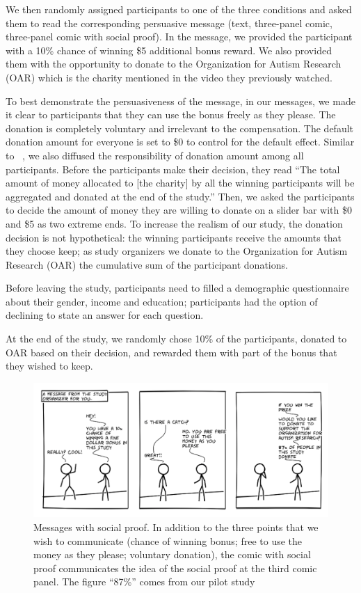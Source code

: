 We then randomly assigned participants to one of the three conditions and asked them to read the corresponding persuasive message (text, three-panel comic, three-panel comic with social proof). In the message, we provided the participant with a 10\% chance of winning \$5 additional bonus reward. We also provided them with the opportunity to donate to the Organization for Autism Research (OAR) which is the charity mentioned in the video they previously watched. 

To best demonstrate the persuasiveness of the message, in our messages, we made it clear to participants that they can use the bonus freely as they please. The donation is completely voluntary and irrelevant to the compensation. The default donation amount for everyone is set to \$0 to control for the default effect. Similar to ~\textcite{lee2013does}, we also diffused the responsibility of donation amount among all participants. Before the participants make their decision, they read ``The total amount of money allocated to [the charity] by all the winning participants will be aggregated and donated at the end of the study.'' Then, we asked the participants to decide the amount of money they are willing to donate on a slider bar with \$0 and \$5 as two extreme ends. To increase the realism of our study, the donation decision is not hypothetical: the winning participants receive the amounts that they choose keep; as study organizers we donate to the Organization for Autism Research (OAR) the cumulative sum of the participant donations. 

Before leaving the study, participants need to filled a demographic questionnaire about their gender, income and education; participants had the option of declining to state an answer for each question.

At the end of the study, we randomly chose 10\% of the participants, donated to OAR based on their decision, and rewarded them with part of the bonus that they wished to keep.

\begin{figure}[bt]
    \centering
    \includegraphics[width=\columnwidth]{./figures/social_proof.png}
    \caption{Messages with social proof. In addition to the three points that we wish to communicate (chance of winning bonus; free to use the money as they please; voluntary donation), the comic with social proof communicates the idea of the social proof at the third comic panel. The figure ``87\%'' comes from our pilot study}
    \label{fig:basic three comic social proof}
\end{figure}



